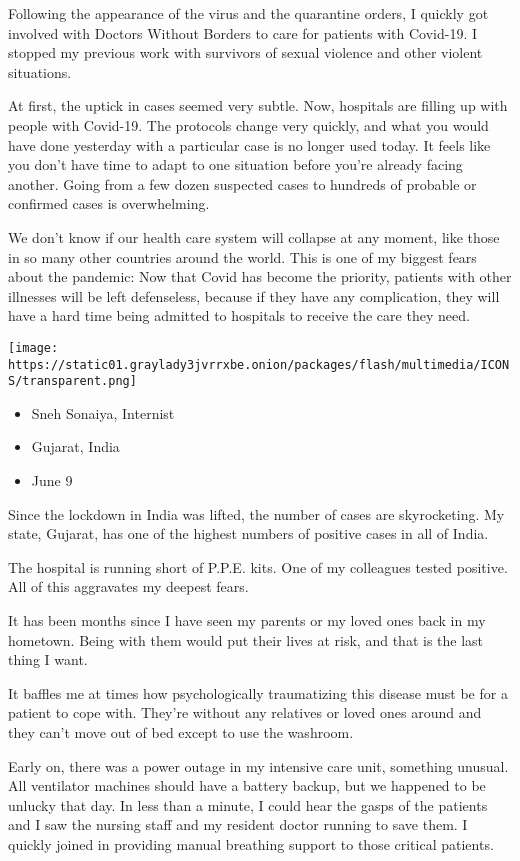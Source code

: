 Following the appearance of the virus and the quarantine orders, I
quickly got involved with Doctors Without Borders to care for patients
with Covid-19. I stopped my previous work with survivors of sexual
violence and other violent situations.

At first, the uptick in cases seemed very subtle. Now, hospitals are
filling up with people with Covid-19. The protocols change very quickly,
and what you would have done yesterday with a particular case is no
longer used today. It feels like you don't have time to adapt to one
situation before you're already facing another. Going from a few dozen
suspected cases to hundreds of probable or confirmed cases is
overwhelming.

We don't know if our health care system will collapse at any moment,
like those in so many other countries around the world. This is one of
my biggest fears about the pandemic: Now that Covid has become the
priority, patients with other illnesses will be left defenseless,
because if they have any complication, they will have a hard time being
admitted to hospitals to receive the care they need.

\texttt{[image: https://static01.graylady3jvrrxbe.onion/packages/flash/multimedia/ICONS/transparent.png]}

\begin{itemize}
\tightlist
\item
  Sneh Sonaiya, Internist
\item
  Gujarat, India
\item
  June 9
\end{itemize}

Since the lockdown in India was lifted, the number of cases are
skyrocketing. My state, Gujarat, has one of the highest numbers of
positive cases in all of India.

The hospital is running short of P.P.E. kits. One of my colleagues
tested positive. All of this aggravates my deepest fears.

It has been months since I have seen my parents or my loved ones back in
my hometown. Being with them would put their lives at risk, and that is
the last thing I want.

It baffles me at times how psychologically traumatizing this disease
must be for a patient to cope with. They're without any relatives or
loved ones around and they can't move out of bed except to use the
washroom.

Early on, there was a power outage in my intensive care unit, something
unusual. All ventilator machines should have a battery backup, but we
happened to be unlucky that day. In less than a minute, I could hear the
gasps of the patients and I saw the nursing staff and my resident doctor
running to save them. I quickly joined in providing manual breathing
support to those critical patients.


